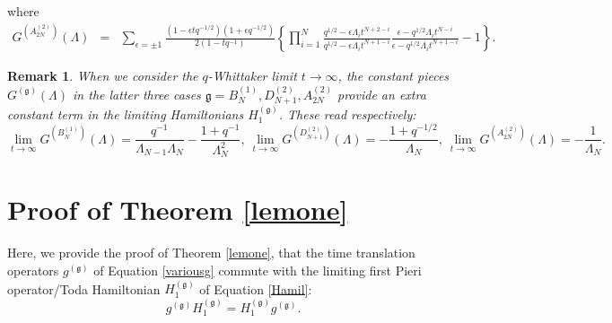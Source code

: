\documentclass[12pt]{amsart}
\newtheorem{remark}[thm]{Remark}
\newcommand{\g}{{\mathfrak{g}}}
\newcommand{\lL}{{\Lambda}}
\numberwithin{equation}{section}
\begin{document}
where
\begin{eqnarray*}
G^{(A_{2N}^{(2)})}(\lL)&=& \sum_{\epsilon=\pm 1} \frac{(1-\epsilon t q^{-1/2})(1+\epsilon q^{-1/2})}{2(1-t q^{-1})} \left\{ \prod_{i=1}^N \frac{q^{1/2}-\epsilon \lL_it^{N+2-i}}{q^{1/2}-\epsilon \lL_it^{N+1-i}}\frac{\epsilon-q^{1/2}\lL_it^{N-i}}{\epsilon-q^{1/2}\lL_it^{N+1-i}}-1\right\}.
\end{eqnarray*}

\begin{remark}\label{remlimops}
When we consider the $q$-Whittaker limit $t\to \infty$, the constant pieces $G^{(\g)}(\lL)$ in the latter three cases $\g=B_N^{(1)},D_{N+1}^{(2)},A_{2N}^{(2)}$ provide an extra constant term
in the limiting Hamiltonians $H_1^{(\g)}$. These read respectively:
$$\lim_{t\to\infty} G^{(B_N^{(1)})}(\Lambda)=\frac{q^{-1}}{\lL_{N-1}\lL_N}-\frac{1+q^{-1}}{\lL_N^2} ,\ \lim_{t\to\infty} G^{(D_{N+1}^{(2)})}(\Lambda)=-\frac{1+q^{-1/2}}{\lL_N} ,\ \lim_{t\to\infty} G^{(A_{2N}^{(2)})}(\Lambda)=-\frac{1}{\lL_N} .
$$
\end{remark}

%
%
%
%
%
%
%
%
%
%
%
%
%
%
%
%
%
%
%
%
%
%
%
%
%
%
%
%
%
%
%
%
%
%
%
%
%
%
%
%
%
%
%
%
%
%
%
%
%
%



\section{Proof of Theorem \ref{lemone}
%
}\label{appC}
%

%
%

%

%
%
%




%
%
%
%
%
%
%
%
%
%
%
%
%
%
%
%
%
%
%
%
%
%
%
%
%
%
%
%
%
%
%
%
%
%


%
%
%
%
%
%
%
%

%
%
%
%
%
%
%
%
%
%


%
%
%
%
%
%
%
%
%
%
%
%
%
%
%
%
%
%
%
%
%
%
%
%
%
%
%
%
%
%
%
%
%
%
%
%
%
%
%
%
%
%
%
%

%
%
%
%
%
%
%
%
%
%
%
%
%
%
%
%
%
%
%
%
%
%
%
%
%
%
%
%
%
%
%
%
%
%
%
%
%
%
%
%
%
%
%
%
%
%
%
%
%
%
%
%
%
%
%
%
%
%
%
%
%
%
%
%
%
%
%
%
%
%
%
%
%
%
%



%
\label{appCtwo}

Here, we provide the proof of  Theorem \ref{lemone}, that the time translation operators $g^{(\g)}$ of Equation \eqref{variousg}
commute with the limiting first Pieri operator/Toda Hamiltonian  $H_1^{(\g)}$ of Equation \eqref{Hamil}:
\begin{equation} \label{commute} g^{(\g)} H_1^{(\g)}= H_1^{(\g)}g^{(\g)} .\end{equation}
\end{document}
